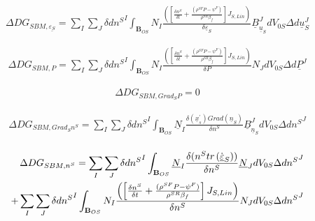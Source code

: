 \documentclass[12pt]{article}
\begin{document}
	\begin{equation*}
		\begin{aligned}
			\Delta DG_{SBM, \underline{\varepsilon_{S}}}=\sum_{I}\sum_{J}{\delta d{n^S}^{I}}\int_{\mathbf{B}_{OS}}{N_{I}}{\frac{\left(\left[\frac{\delta n^{S}}{\delta t}+\frac{({\rho^{SF}}{P}-{\psi^{F}})}{{\rho^{SR}}{\beta_{f}}}\right]{J_{S,Lin}}\right)}{\delta \underline{\varepsilon}_{S}}}{\underline{B}_{\underline{u}_{S}}^{J}}{dV_{0S}}{\Delta d\underline{u}_{S}^{J}}
		\end{aligned}    
	\end{equation*}
	
	\begin{equation*}
		\begin{aligned}
			\Delta DG_{SBM, P}=\sum_{I}\sum_{J}{\delta d{n^S}^{I}}\int_{\mathbf{B}_{OS}}{N_{I}}{\frac{\left(\left[\frac{\delta n^{S}}{\delta t}+\frac{({\rho^{SF}}{P}-{\psi^{F}})}{{\rho^{SR}}{\beta_{f}}}\right]{J_{S,Lin}}\right)}{\delta P}}{N_{J}}{dV_{0S}}{\Delta d\underline{P}^{J}}
		\end{aligned}    
	\end{equation*}
	
	\begin{equation*}
		\begin{aligned}
			\Delta DG_{SBM, {Grad_{S}}{P}}=0
		\end{aligned}    
	\end{equation*}
	
	\begin{equation*}
		\begin{aligned}
			\Delta DG_{SBM, {Grad_{S}}{n^S}}=\sum_{I}\sum_{J}{\delta d{n^S}^{I}}\int_{\mathbf{B}_{OS}}{{\underline{N}_{I}}}{\frac{{\delta ({\underline{x}_{s}^{'}})}{Grad({\underline{n}_{S}})}}{\delta n^{S}}}{\underline{B}_{\underline{n}_{S}}^{J}}{dV_{0S}}{\Delta d{n^S}^{J}} \\
		\end{aligned}    
	\end{equation*}
	
	\begin{equation*}
		\begin{aligned}
			\Delta DG_{SBM, {n^S}}=\sum_{I}\sum_{J}{\delta d{n^S}^{I}}\int_{\mathbf{B}_{OS}}{{\underline{N}_{I}}}{\frac{\delta ({n^S}{tr\hspace{0.5mm}(\Dot{\underline{\varepsilon}}_{S})})}{\delta n^{S}}}{\underline{N}_{J}}{dV_{0S}}{\Delta d{n^S}^{J}} \\+ \sum_{I}\sum_{J}{\delta d{n^S}^{I}}\int_{\mathbf{B}_{OS}}{N_{I}}{\frac{\left(\left[\frac{\delta n^{S}}{\delta t}+\frac{({\rho^{SF}}{P}-{\psi^{F}})}{{\rho^{SR}}{\beta_{f}}}\right]{J_{S,Lin}}\right)}{\delta n^{S}}}{N_{J}}{dV_{0S}}{\Delta d{n^S}^{J}}
		\end{aligned}    
	\end{equation*}
\end{document}
